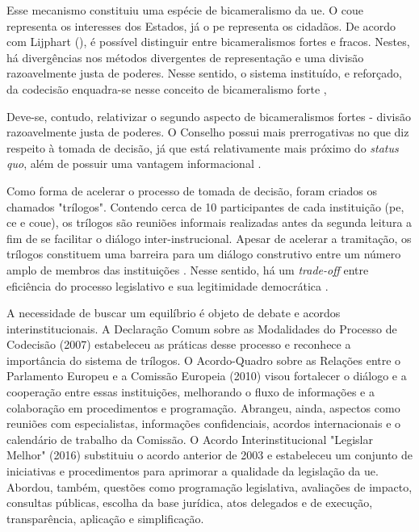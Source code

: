 Esse mecanismo constituiu uma espécie de bicameralismo da \acrshort{ue}. O \acrshort{coue} representa os interesses dos Estados, já o \acrshort{pe} representa os cidadãos. De acordo com Lijphart (\citeyear{lijphart2019modelos}), é possível distinguir entre bicameralismos fortes e fracos. Nestes, há divergências nos métodos divergentes de representação e uma divisão razoavelmente justa de poderes. Nesse sentido, o sistema instituído, e reforçado, da codecisão enquadra-se nesse conceito de bicameralismo forte \cite{burns2014},

Deve-se, contudo, relativizar o segundo aspecto de bicameralismos fortes - divisão razoavelmente justa de poderes. O Conselho possui mais prerrogativas no que diz respeito à tomada de decisão, já que está relativamente mais próximo do \textit{status quo}, além de possuir uma vantagem informacional \cite{shackleton2003codecision}.

Como forma de acelerar o processo de tomada de decisão, foram criados os chamados "trílogos". Contendo cerca de 10 participantes de cada instituição (\acrshort{pe}, \acrshort{ce} e \acrshort{coue}), os trílogos são reuniões informais realizadas antes da segunda leitura a fim de se facilitar o diálogo inter-instrucional. Apesar de acelerar a tramitação, os trílogos constituem uma barreira para um diálogo construtivo entre um número amplo de membros das instituições \cite{griller_lisbon_2008}. Nesse sentido, há um \textit{trade-off} entre eficiência do processo legislativo e sua legitimidade democrática \cite{shackleton2003codecision}.

A necessidade de buscar um equilíbrio é objeto de debate e acordos interinstitucionais. A Declaração Comum sobre as Modalidades do Processo de Codecisão (2007) estabeleceu as práticas desse processo e reconhece a importância do sistema de trílogos. O Acordo-Quadro sobre as Relações entre o Parlamento Europeu e a Comissão Europeia (2010) visou fortalecer o diálogo e a cooperação entre essas instituições, melhorando o fluxo de informações e a colaboração em procedimentos e programação. Abrangeu, ainda, aspectos como reuniões com especialistas, informações confidenciais, acordos internacionais e o calendário de trabalho da Comissão. O Acordo Interinstitucional "Legislar Melhor" (2016) substituiu o acordo anterior de 2003 e estabeleceu um conjunto de iniciativas e procedimentos para aprimorar a qualidade da legislação da \acrshort{ue}. Abordou, também, questões como programação legislativa, avaliações de impacto, consultas públicas, escolha da base jurídica, atos delegados e de execução, transparência, aplicação e simplificação.

